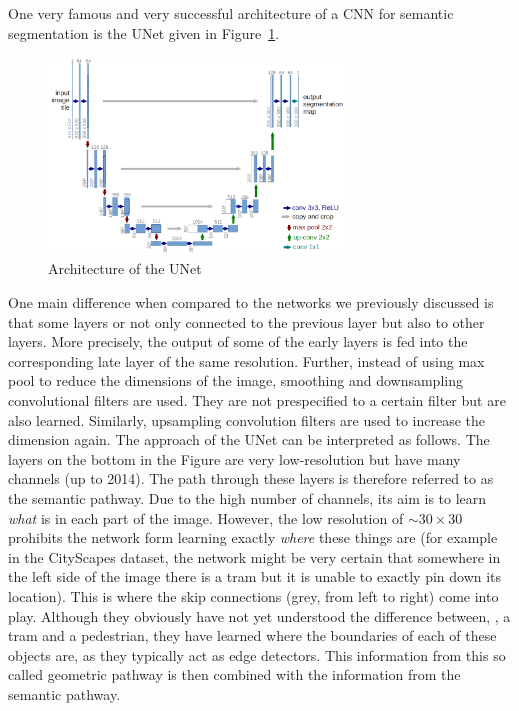 One very famous and very successful architecture of a CNN for semantic
segmentation is the UNet given in Figure~\ref{fig:unet}.
\begin{figure}[htpb]
  \centering \includegraphics[width=0.7\textwidth]{Figures/unet}%
  \caption{Architecture of the UNet}%
  \label{fig:unet}
\end{figure}
One main difference when compared to the networks we previously discussed is
that some layers or not only connected to the previous layer but also to other
layers. More precisely, the output of some of the early layers is fed into the
corresponding late layer of the same resolution. Further, instead of using max
pool to reduce the dimensions of the image, smoothing and downsampling
convolutional filters are used. They are not prespecified to a certain filter
but are also learned. Similarly, upsampling convolution filters are used to
increase the dimension again. The approach of the UNet can be interpreted as
follows. The layers on the bottom in the Figure are very low-resolution but have
many channels (up to 2014). The path through these layers is therefore referred
to as the semantic pathway. Due to the high number of channels, its aim is to
learn \emph{what} is in each part of the image. However, the low resolution of
$\sim 30 \times 30$ prohibits the network form learning exactly \emph{where}
these things are (for example in the CityScapes dataset, the network might be
very certain that somewhere in the left side of the image there is a tram but it
is unable to exactly pin down its location). This is where the skip connections
(grey, from left to right) come into play. Although they obviously have not yet
understood the difference between, \eg, a tram and a pedestrian, they have
learned where the boundaries of each of these objects are, as they typically act
as edge detectors. This information from this so called geometric pathway is
then combined with the information from the semantic pathway.

